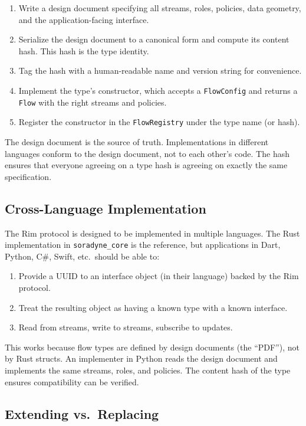 \documentclass[11pt, letterpaper]{article}
\begin{document}
\begin{enumerate}[leftmargin=2em]
  \item Write a design document specifying all streams, roles, policies, data geometry,
    and the application-facing interface.
  \item Serialize the design document to a canonical form and compute its content hash.
    This hash is the type identity.
  \item Tag the hash with a human-readable name and version string for convenience.
  \item Implement the type's constructor, which accepts a \texttt{FlowConfig} and
    returns a \texttt{Flow} with the right streams and policies.
  \item Register the constructor in the \texttt{FlowRegistry} under the type name
    (or hash).
\end{enumerate}

The design document is the source of truth. Implementations in different languages
conform to the design document, not to each other's code. The hash ensures that
everyone agreeing on a type hash is agreeing on exactly the same specification.

\subsection{Cross-Language Implementation}

The Rim protocol is designed to be implemented in multiple languages. The Rust
implementation in \texttt{soradyne\_core} is the reference, but applications in Dart,
Python, C\#, Swift, etc.\ should be able to:

\begin{enumerate}[leftmargin=2em]
  \item Provide a UUID to an interface object (in their language) backed by the
    Rim protocol.
  \item Treat the resulting object as having a known type with a known interface.
  \item Read from streams, write to streams, subscribe to updates.
\end{enumerate}

This works because flow types are defined by design documents (the ``PDF''), not by
Rust structs. An implementer in Python reads the design document and implements the
same streams, roles, and policies. The content hash of the type ensures compatibility
can be verified.

\subsection{Extending vs.\ Replacing}
\end{document}

